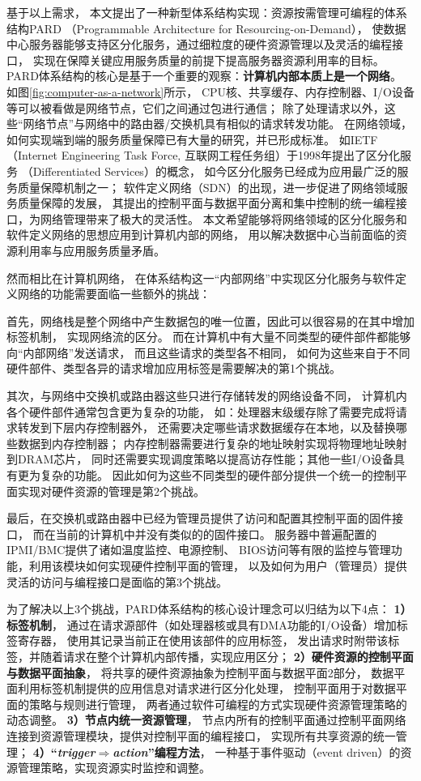 基于以上需求，
本文提出了一种新型体系结构实现：资源按需管理可编程的体系结构PARD
（Programmable Architecture for Resourcing-on-Demand）\cite{pard:2015}，
使数据中心服务器能够支持区分化服务，通过细粒度的硬件资源管理以及灵活的编程接口，
实现在保障关键应用服务质量的前提下提高服务器资源利用率的目标。
PARD体系结构的核心是基于一个重要的观察：\textbf{计算机内部本质上是一个网络}。
如图\ref{fig:computer-as-a-network}所示，
CPU核、共享缓存、内存控制器、I/O设备等可以被看做是网络节点，它们之间通过包进行通信；
除了处理请求以外，这些``网络节点''与网络中的路由器/交换机具有相似的请求转发功能。
在网络领域，如何实现端到端的服务质量保障已有大量的研究，并已形成标准。
如IETF（Internet Engineering Task Force, 互联网工程任务组）于1998年提出了区分化服务
（Differentiated Services）\cite{DiffServ}的概念，
如今区分化服务已经成为应用最广泛的服务质量保障机制之一；
软件定义网络（SDN）\cite{SDN}的出现，进一步促进了网络领域服务质量保障的发展，
其提出的控制平面与数据平面分离和集中控制的统一编程接口，为网络管理带来了极大的灵活性。
本文希望能够将网络领域的区分化服务和软件定义网络的思想应用到计算机内部的网络，
用以解决数据中心当前面临的资源利用率与应用服务质量矛盾。

然而相比在计算机网络，
在体系结构这一``内部网络''中实现区分化服务与软件定义网络的功能需要面临一些额外的挑战：

首先，网络栈是整个网络中产生数据包的唯一位置，因此可以很容易的在其中增加标签机制，
实现网络流的区分。
而在计算机中有大量不同类型的硬件部件都能够向``内部网络''发送请求，
而且这些请求的类型各不相同，
如何为这些来自于不同硬件部件、类型各异的请求增加应用标签是需要解决的第1个挑战。

其次，与网络中交换机或路由器这些只进行存储转发的网络设备不同，
计算机内各个硬件部件通常包含更为复杂的功能，
如：处理器末级缓存除了需要完成将请求转发到下层内存控制器外，
还需要决定哪些请求数据缓存在本地，以及替换哪些数据到内存控制器；
内存控制器需要进行复杂的地址映射实现将物理地址映射到DRAM芯片，
同时还需要实现调度策略以提高访存性能；其他一些I/O设备具有更为复杂的功能。
因此如何为这些不同类型的硬件部分提供一个统一的控制平面实现对硬件资源的管理是第2个挑战。

最后，在交换机或路由器中已经为管理员提供了访问和配置其控制平面的固件接口，
而在当前的计算机中并没有类似的的固件接口。
服务器中普遍配置的IPMI/BMC\cite{ipmi}提供了诸如温度监控、电源控制、
BIOS访问等有限的监控与管理功能，利用该模块如何实现硬件控制平面的管理，
以及如何为用户（管理员）提供灵活的访问与编程接口是面临的第3个挑战。

为了解决以上3个挑战，PARD体系结构的核心设计理念可以归结为以下4点：
\textbf{1）标签机制}，
通过在请求源部件（如处理器核或具有DMA功能的I/O设备）增加标签寄存器，
使用其记录当前正在使用该部件的应用标签，
发出请求时附带该标签，并随着请求在整个计算机内部传播，实现应用区分；
\textbf{2）硬件资源的控制平面与数据平面抽象}，
将共享的硬件资源抽象为控制平面与数据平面2部分，
数据平面利用标签机制提供的应用信息对请求进行区分化处理，
控制平面用于对数据平面的策略与规则进行管理，
两者通过软件可编程的方式实现硬件资源管理策略的动态调整。
\textbf{3）节点内统一资源管理}，
节点内所有的控制平面通过控制平面网络连接到资源管理模块，提供对控制平面的编程接口，
实现所有共享资源的统一管理；
\textbf{4）``\emph{trigger$\Rightarrow$action}''编程方法}，
一种基于事件驱动（event driven）的资源管理策略，实现资源实时监控和调整。

